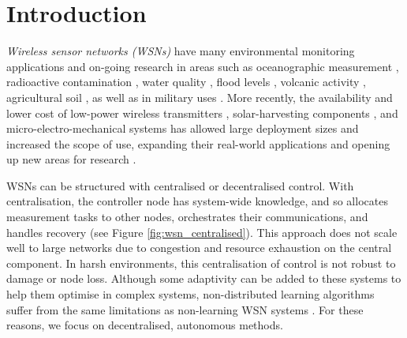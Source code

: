 \section{Introduction}

\textit{Wireless sensor networks (WSNs)} have many environmental monitoring applications and on-going research in areas such as oceanographic measurement \citep{Mahdy2008a, Albaladejo2010, 6973877}, radioactive contamination \citep{Gomez2015}, water quality \citep{Fang2010}, flood levels \citep{Castillo2004}, volcanic activity \citep{Werner-Allen2006}, agricultural soil \citep{8745854}, as well as in military uses \citep{6268958}. More recently, the availability and lower cost of low-power wireless transmitters \citep{902661}, solar-harvesting components \citep{Prauzek2018}, and micro-electro-mechanical systems \citep{1045391} has allowed large deployment sizes and increased the scope of use, expanding their real-world applications and opening up new areas for research \citep{5597912, Kandris2020}.

WSNs can be structured with centralised or decentralised control. With centralisation, the controller node has system-wide knowledge, and so allocates measurement tasks to other nodes, orchestrates their communications, and handles recovery (see Figure \ref{fig:wsn_centralised}). This approach does not scale well to large networks due to congestion and resource exhaustion on the central component. In harsh environments, this centralisation of control is not robust to damage or node loss. Although some adaptivity can be added to these systems to help them optimise in complex systems, non-distributed learning algorithms suffer from the same limitations as non-learning WSN systems \citep{Imagestate2006}. For these reasons, we focus on decentralised, autonomous methods.

